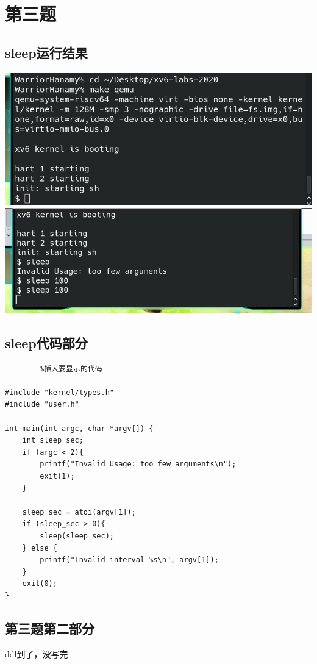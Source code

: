 \documentclass{article}
\begin{document}
\section*{第三题}
\subsection{sleep运行结果}
\label{subsec:label}
\includegraphics[scale=0.6]{boot.png}
\includegraphics[scale=0.6]{sleep.png}
\subsection{sleep代码部分}
\label{subsec:label}


\lstset{language=C}
\begin{lstlisting}        %插入要显示的代码

#include "kernel/types.h"
#include "user.h"

int main(int argc, char *argv[]) {
	int sleep_sec;
	if (argc < 2){
		printf("Invalid Usage: too few arguments\n");
		exit(1);
	}

	sleep_sec = atoi(argv[1]);
	if (sleep_sec > 0){
		sleep(sleep_sec);
	} else {
		printf("Invalid interval %s\n", argv[1]);
	}
	exit(0);
}
\end{lstlisting}

\subsection{第三题第二部分}
\label{subsec:label}
ddl到了，没写完
\end{document}
